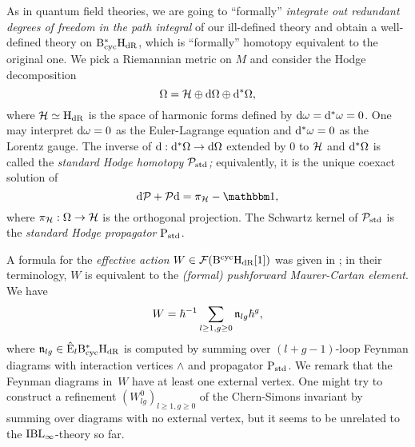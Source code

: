 \documentclass[\MainFolder/Text.tex]{subfiles}
\begin{document}

As in quantum field theories, we are going to ``formally'' \emph{integrate out redundant degrees of freedom in the path integral} of our ill-defined theory and obtain a well-defined theory on $\mathrm{B}_{\mathrm{cyc}}^*\mathrm{H}_{\mathrm{dR}}$, which is ``formally'' homotopy equivalent to the original one.
We pick a Riemannian metric on $M$ and consider the Hodge decomposition
\[
\Omega = \mathcal{H} \oplus \mathrm{d}\Omega \oplus \mathrm{d}^*\Omega,
\]
where $\mathcal{H} \simeq \mathrm{H}_{\mathrm{dR}}$ is the space of harmonic forms defined by $\mathrm{d} \omega = \mathrm{d}^* \omega = 0$.
One may interpret $\mathrm{d} \omega = 0$ as the Euler-Lagrange equation and $\mathrm{d}^* \omega = 0$ as the Lorentz gauge.
The inverse of $\mathrm{d}: \mathrm{d}^*\Omega \rightarrow \mathrm{d}\Omega$ extended by $0$ to $\mathcal{H}$ and $\mathrm{d}^*\Omega$ is called the \emph{standard Hodge homotopy $\mathcal{P}_{\mathrm{std}}$;} equivalently, it is the unique coexact solution of
\[
\Dd \Htp + \Htp \Dd = \pi_\Harm - \Id,
\]
where $\pi_{\mathcal{H}}: \Omega \rightarrow \mathcal{H}$ is the orthogonal projection.
The Schwartz kernel of $\mathcal{P}_{\mathrm{std}}$ is the \emph{standard Hodge propagator} $\mathrm{P}_{\mathrm{std}}$.

A formula for the \emph{effective action} $W\in\mathcal{F}(\mathrm{B}^{\mathrm{cyc}}\mathrm{H}_{\mathrm{dR}}[1])$ was given in \cite{Cieliebak2015}; in their terminology, $W$ is equivalent to the \emph{(formal) pushforward Maurer-Cartan element}.
We have
\[ W = \hbar^{-1}\sum_{l\ge 1, g\ge 0} \mathfrak{n}_{lg} \hbar^{g}, \]
where $\mathfrak{n}_{lg} \in \hat{\mathrm{E}}_l \mathrm{B}_{\mathrm{cyc}}^*\mathrm{H}_{\mathrm{dR}}$ is computed by summing over $(l+g-1)$-loop Feynman diagrams with interaction vertices $\wedge$ and propagator $\mathrm{P}_{\mathrm{std}}$.
We remark that the Feynman diagrams in~$W$ have at least one external vertex.
One might try to construct a refinement $(W^0_{lg})_{l\ge 1, g\ge 0}$ of the Chern-Simons invariant by summing over diagrams with no external vertex, but it seems to be unrelated to the $\mathrm{IBL}_\infty$-theory so far.
\end{document}
